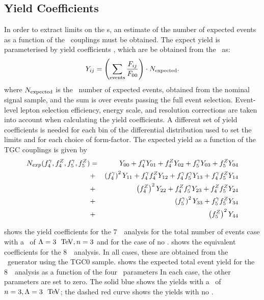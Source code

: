 \subsection{Yield Coefficients}

In order to extract limits on the \TGC s, an estimate of the number of expected events as a
function of the \TGC\ couplings must be obtained. The expect yield is parameterised by
yield coefficients \Yij, which are be obtained from the \Fij\ as:
\begin{equation}
Y_{ij} = \left( \sum_{\rm events} \frac{F_{ij}}{F_{00} } \right) \cdot{N_{\rm expected}}.
\end{equation}
where $N_{\rm expected}$ is the \sm\ number of expected events, obtained from the
nominal signal sample, and the sum is over events passing the full event
selection. Event-level lepton selection efficiency, energy scale, and resolution corrections
are taken into account when calculating the yield coefficients. A different set of yield
coefficients is needed for each bin of the differential distribution used to set
the limits and for each choice of
form-factor. The expected yield as a function of the TGC couplings is given by
\begin{eqnarray}\label{eqn:Nexp_TGC}
N_{exp} (f_{4}^{\gamma}, f_{4}^{Z}, f_{5}^{\gamma}, f_{5}^{Z}) & = & Y_{00} + f_4^\gamma Y_{01} + f_4^Z Y_{02} + f_5^\gamma Y_{03} + f_5^Z Y_{04}  \nonumber \\
&+& \left(f_4^\gamma\right)^2Y_{11} + f_4^\gamma f_4^Z Y_{12} +  f_4^\gamma f_5^\gamma Y_{13} + f_4^\gamma f_5^Z Y_{14}  \nonumber \\
&+& \left(f_4^Z\right)^2Y_{22} + f_4^Zf_5^\gamma Y_{23} + f_4^Zf_5^Z Y_{24}  \nonumber \\
&+& \left(f_5^\gamma\right)^2Y_{33} + f_5^\gamma f_5^Z Y_{34} \nonumber \\
&+& \left(f_5^Z\right)^2Y_{44}
\end{eqnarray}

 shows the yield
coefficients for the 7~\tev\ analysis for the total number of events case with a \formfactor\
of $\Lambda=3~\tev, n=3$ and for the case of no \formfactor.
 shows the
equivalent coefficients for the 8~\tev\ analysis. In all cases, these are
obtained from the \BR\ generator using the TGC0 sample.  shows
the expected total event yield for the 8~\tev\ analysis as a function of the
four \TGC\ parameters In each case, the other parameters are set to
zero. The solid blue shows the yields with a \formfactor\ of $n=3,
\Lambda=3~\tev$; the dashed red curve shows the yields with no \formfactor.

